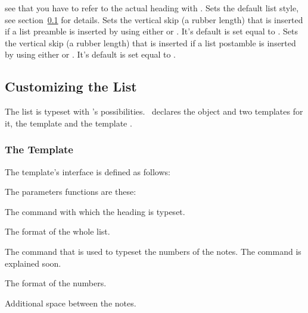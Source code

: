 \documentclass[load-preamble+]{cnltx-doc}
\begin{document}
\begin{options}
    see that you have to refer to the actual heading with .
    Sets the default list style, see section~\ref{sec:customizing_the_list}
    for details.
    Sets the vertical skip (a rubber length) that is
    inserted if a list preamble is inserted by using either
     or .  It's default is set
    equal to .
    Sets the vertical skip (a rubber length) that is
    inserted if a list postamble is inserted by using either
     or .  It's default
    is set equal to .
\end{options}

\subsection{Customizing the List}\label{sec:customizing_the_list}
The list is typeset with 's possibilities.  \enotez\ declares
the object  and two templates for it, the template
 and the template .

\subsubsection{The  Template}
The  template's interface is defined as follows:
The parameters functions are these:
\begin{description}[style=nextline]
  \item[\code{heading}] The command with which the heading is typeset.
  \item[\code{format}] The format of the whole list.
  \item[\code{number}] The command that is used to typeset the numbers of the
    notes.  The command  is explained soon.
  \item[\code{numbers-format}] The format of the numbers.
  \item[\code{notes-sep}] Additional space between the notes.
\end{description}
\end{document}
